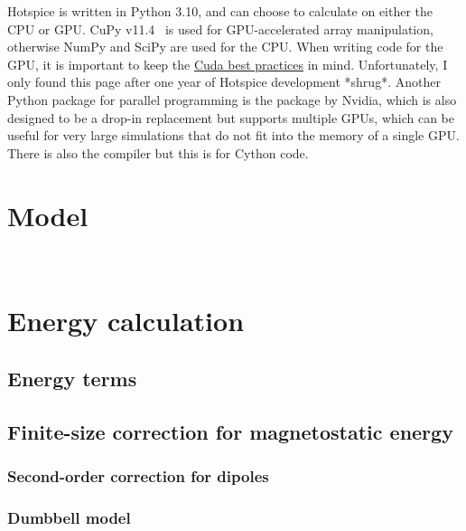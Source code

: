 Hotspice is written in Python 3.10, and can choose to calculate on either the CPU or GPU.
CuPy v11.4~\cite{CuPy} is used for GPU-accelerated array manipulation, otherwise NumPy and SciPy are used for the CPU.
When writing code for the GPU, it is important to keep the \href{https://docs.nvidia.com/cuda/cuda-c-best-practices-guide/index.html}{Cuda best practices} in mind.
Unfortunately, I only found this page after one year of Hotspice development *shrug*.
Another Python package for parallel programming is the  package by Nvidia, which is also designed to be a drop-in  replacement but supports multiple GPUs, which can be useful for very large simulations that do not fit into the memory of a single GPU.
There is also the  compiler but this is for Cython code. \par

\section{Model}

\cite{Hotspice}

\\

\section{Energy calculation}
\subsection{Energy terms}
\subsection{Finite-size correction for magnetostatic energy}
\subsubsection{Second-order correction for dipoles}
\subsubsection{Dumbbell model}

